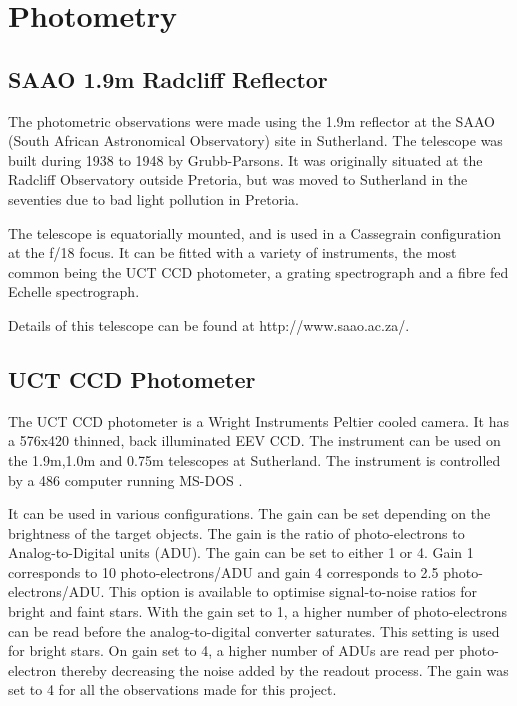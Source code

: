 \chapter{Photometry}

\label{ch_photometry}

% 

\section{SAAO 1.9m Radcliff Reflector}

\label{saao1.9}

The photometric observations were made using the 1.9m reflector at the SAAO (South African Astronomical Observatory) site in Sutherland. The telescope was built during 1938 to 1948 by Grubb-Parsons. It was originally situated at the Radcliff Observatory outside Pretoria, but was moved to Sutherland in the seventies due to bad light pollution in Pretoria.

The telescope is equatorially mounted, and is used in a Cassegrain configuration at the f/18 focus. It can be fitted with a variety of instruments, the most common being the UCT CCD photometer, a grating spectrograph and a fibre fed Echelle spectrograph.

Details of this telescope can be found at http://www.saao.ac.za/.

\section{UCT CCD Photometer}
\label{uctccd}

The UCT CCD photometer is a Wright Instruments Peltier cooled camera. It has a 576x420 thinned, back illuminated EEV CCD. The instrument can be used on the 1.9m,1.0m and 0.75m telescopes at Sutherland. The instrument is controlled by a 486 computer running MS-DOS \citep{UCTCCD}.

It can be used in various configurations. The gain can be set depending on the brightness of the target objects. The gain is the ratio of photo-electrons to Analog-to-Digital units (ADU). The gain can be set to either 1 or 4. Gain 1 corresponds to 10 photo-electrons/ADU and gain 4 corresponds to 2.5 photo-electrons/ADU. This option is available to optimise signal-to-noise ratios for bright and faint stars. With the gain set to 1, a higher number of photo-electrons can be read before the analog-to-digital converter saturates. This setting is used for bright stars. On gain set to 4, a higher number of ADUs are read per photo-electron thereby decreasing the noise added by the readout process.  The gain was set to 4 for all the observations made for this project.

